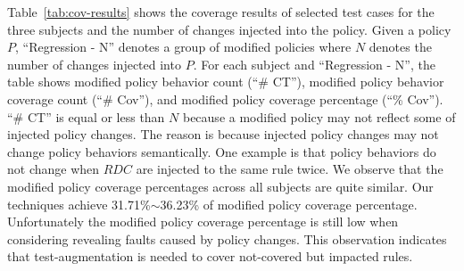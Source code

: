 Table~\ref{tab:cov-results} shows the coverage results of selected test cases for the three subjects and
the number of changes injected into the policy.
Given a policy $P$,
``Regression - N'' denotes a group of modified policies where $N$ denotes the number of changes injected into $P$. 
For each subject and ``Regression - N'',
the table shows modified policy behavior count (``\# CT''),  modified policy behavior coverage count (``\# Cov''), and modified policy coverage percentage (``\% Cov'').
``\# CT'' is equal or less than $N$ because a modified policy may not
reflect some of injected policy changes. The reason is because injected policy
changes may not change policy behaviors semantically.
One example is that policy behaviors do not change
when $RDC$ are injected to the same rule twice.
We observe that the modified policy coverage percentages across all subjects are quite similar. Our techniques achieve 31.71\%$\sim$36.23\% of modified policy coverage percentage.
Unfortunately the
modified policy coverage percentage is still low when considering revealing
faults caused by policy changes.
This observation indicates that test-augmentation
is needed to cover not-covered but impacted rules. 

%

%




